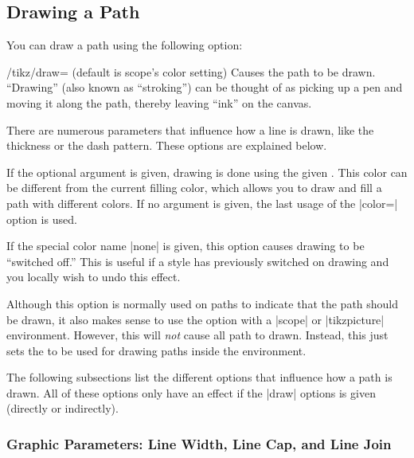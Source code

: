 \subsection{Drawing a Path}

You can draw a path using the following option:
\begin{key}{/tikz/draw= (default \normalfont is scope's color setting)}
  Causes the path to be drawn. ``Drawing'' (also known as
  ``stroking'') can be thought of as picking up a pen and moving it
  along the path, thereby leaving ``ink'' on the canvas.

  There are numerous parameters that influence how a line is drawn,
  like the thickness or the dash pattern. These options are explained
  below.

  If the optional  argument is given, drawing is done
  using the given . This color can be different from the
  current filling color, which allows you to draw and fill a path with
  different colors. If no  argument is given, the last
  usage of the |color=| option is used.

  If the special color name |none| is given, this option causes
  drawing to be ``switched off.'' This is useful if a style has
  previously switched on drawing and you locally wish to undo this
  effect. 

  Although this option is normally used on paths to indicate that the
  path should be drawn, it also makes sense to use the option with a
  |{scope}| or |{tikzpicture}| environment. However, this will
  \emph{not} cause all path to drawn. Instead, this just sets the
   to be used for drawing paths inside the environment.

\begin{codeexample}[]
\end{codeexample}
\end{key}


The following subsections list the different options that influence
how a path is drawn. All of these options only have an effect if the
|draw| options is given (directly or indirectly).

\subsubsection{Graphic Parameters: Line Width, Line Cap, and Line Join}

